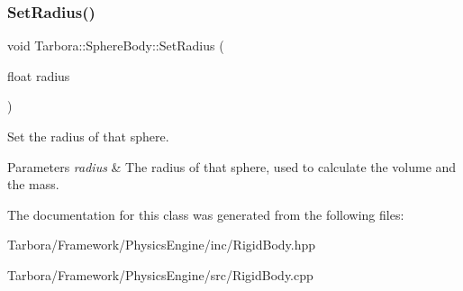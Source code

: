 \subsubsection{\texorpdfstring{Set\+Radius()}{SetRadius()}}
{\footnotesize\ttfamily void Tarbora\+::\+Sphere\+Body\+::\+Set\+Radius (\begin{DoxyParamCaption}\item[{float}]{radius }\end{DoxyParamCaption})\hspace{0.3cm}{\ttfamily [inline]}}



Set the radius of that sphere. 


\begin{DoxyParams}{Parameters}
{\em radius} & The radius of that sphere, used to calculate the volume and the mass. \\
\hline
\end{DoxyParams}


The documentation for this class was generated from the following files\+:\begin{DoxyCompactItemize}
\item 
Tarbora/\+Framework/\+Physics\+Engine/inc/Rigid\+Body.\+hpp\item 
Tarbora/\+Framework/\+Physics\+Engine/src/Rigid\+Body.\+cpp\end{DoxyCompactItemize}
